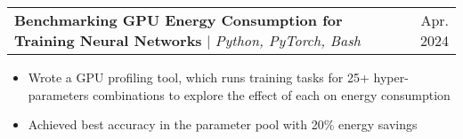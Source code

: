 \documentclass[letterpaper,11t]{article}
\makeatletter
\newcommand{\resumeItem}[1]{
  \item\small{
    {#1 \vspace{-2pt}}
  }
}
\newcommand{\resumeProjectHeading}[2]{
    \item
    \begin{tabular*}{0.97\textwidth}{l@{\extracolsep{\fill}}r}
      \small#1 & #2 \\
    \end{tabular*}\vspace{-7pt}
}
\newcommand{\resumeItemListStart}{\begin{itemize}}
\newcommand{\resumeItemListEnd}{\end{itemize}\vspace{-5pt}}
\makeatother
\begin{document}


        \resumeProjectHeading
        {\textbf{Benchmarking GPU Energy Consumption for Training Neural Networks} $|$ \emph{Python, PyTorch, Bash}}{Apr. 2024}
            \resumeItemListStart
                \resumeItem{Wrote a GPU profiling tool, which runs training tasks for 25+ hyper-parameters combinations to explore the effect of each on energy consumption}
                \resumeItem{Achieved best accuracy in the parameter pool with 20\% energy savings}
            \resumeItemListEnd

\end{document}
